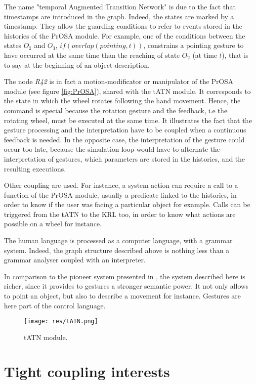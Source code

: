 \documentclass[a4paper]{article}
\begin{document}
The name "temporal Augmented Transition Network" is due to the fact that timestamps are introduced in the graph. Indeed, the states are marked by a timestamp. They allow the guarding conditions to refer to events stored in the histories of the PrOSA module. For example, one of the conditions between the states $O_2$ and $O_3$, $if(overlap(pointing, t))$, constrains a pointing gesture to have occurred at the same time than the reaching of state $O_2$ (at time $t$), that is to say at the beginning of an object description.

The node \textit{R42} is in fact a motion-modificator or manipulator of the PrOSA module (see figure \ref{fig:PrOSA}), shared with the tATN module. It corresponds to the state in which the wheel rotates following the hand movement. Hence, the command is special because the rotation gesture and the feedback, i.e the rotating wheel, must be executed at the same time. It illustrates the fact that the gesture processing and the interpretation have to be coupled when a continuous feedback is needed. In the opposite case, the interpretation of the gesture could occur too late, because the simulation loop would have to alternate the interpretation of gestures, which parameters are stored in the histories, and the resulting executions.

Other coupling are used. For instance, a system action can require a call to a function of the PrOSA module, usually a predicate linked to the histories, in order to know if the user was facing a particular object for example. Calls can be triggered from the tATN to the KRL too, in order to know what actions are possible on a wheel for instance.

The human language is processed as a computer language, with a grammar system. Indeed, the graph structure described above is nothing less than a grammar analyser coupled with an interpreter.

In comparison to the pioneer system presented in \cite{putthatthere}, the system described here is richer, since it provides to gestures a stronger semantic power. It not only allows to point an object, but also to describe a movement for instance. Gestures are here part of the control language.

\begin{figure}[!h]
\centering
\texttt{[image: res/tATN.png]}
\caption{\label{fig:tATN}tATN module.}
\end{figure}

\section{Tight coupling interests}
\end{document}
